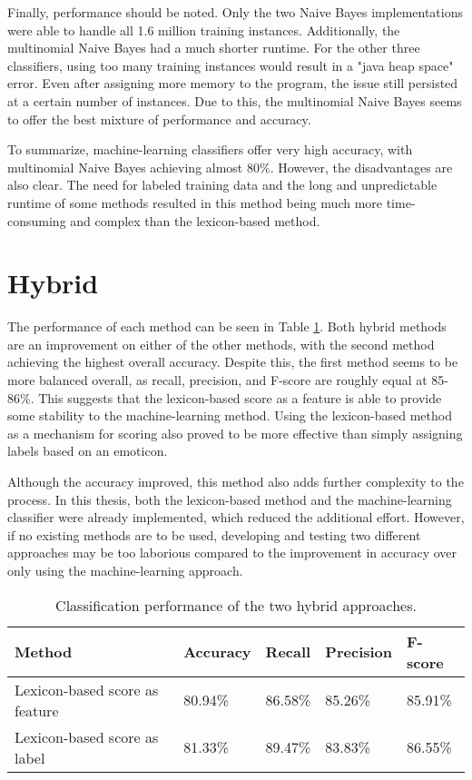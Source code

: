 Finally, performance should be noted. Only the two Naive Bayes implementations were able to handle all 1.6 million training instances. Additionally, the multinomial Naive Bayes had a much shorter runtime. For the other three classifiers, using too many training instances would result in a "java heap space" error. Even after assigning more memory to the program, the issue still persisted at a certain number of instances. Due to this, the multinomial Naive Bayes seems to offer the best mixture of performance and accuracy.

To summarize, machine-learning classifiers offer very high accuracy, with multinomial Naive Bayes achieving almost 80\%. However, the disadvantages are also clear. The need for labeled training data and the long and unpredictable runtime of some methods resulted in this method being much more time-consuming and complex than the lexicon-based method. 

\section{Hybrid}

The performance of each method can be seen in Table \ref{tab:evaluations_hybrid}. Both hybrid methods are an improvement on either of the other methods, with the second method achieving the highest overall accuracy. Despite this, the first method seems to be more balanced overall, as recall, precision, and F-score are roughly equal at 85-86\%. This suggests that the lexicon-based score as a feature is able to provide some stability to the machine-learning method. Using the lexicon-based method as a mechanism for scoring also proved to be more effective than simply assigning labels based on an emoticon. 

Although the accuracy improved, this method also adds further complexity to the process. In this thesis, both the lexicon-based method and the machine-learning classifier were already implemented, which reduced the additional effort. However, if no existing methods are to be used, developing and testing two different approaches may be too laborious compared to the improvement in accuracy over only using the machine-learning approach.

\begin{table}
\caption{Classification performance of the two hybrid approaches.}
\centering
\begin{tabular}{ |p{5.5cm}||p{2cm}|p{2cm}|p{2cm}|p{2cm}|}
 \hline
 Method &          Accuracy &      Recall &     Precision& F-score \\
 \hline
 Lexicon-based score as feature      & 80.94\%&        86.58\%&       85.26\%& 85.91\%\\
  \hline
 Lexicon-based score as label       & 81.33\%&        89.47\%&       83.83\%& 86.55\%\\
  \hline
\end{tabular}
\label{tab:evaluations_hybrid}
\end{table}

